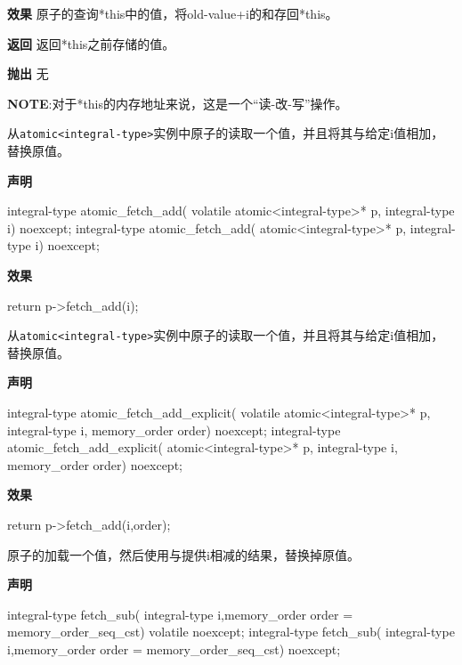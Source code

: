 \textbf{效果}
原子的查询*this中的值，将old-value+i的和存回*this。

\textbf{返回}
返回*this之前存储的值。

\textbf{抛出}
无

\textbf{NOTE}:对于*this的内存地址来说，这是一个“读-改-写”操作。


从\texttt{atomic<integral-type>}实例中原子的读取一个值，并且将其与给定i值相加，替换原值。

\textbf{声明}

\begin{cpp}
integral-type atomic_fetch_add(
    volatile atomic<integral-type>* p, integral-type i) noexcept;
integral-type atomic_fetch_add(
    atomic<integral-type>* p, integral-type i) noexcept;
\end{cpp}

\textbf{效果}

\begin{cpp}
return p->fetch_add(i);
\end{cpp}


从\texttt{atomic<integral-type>}实例中原子的读取一个值，并且将其与给定i值相加，替换原值。

\textbf{声明}

\begin{cpp}
integral-type atomic_fetch_add_explicit(
    volatile atomic<integral-type>* p, integral-type i,
    memory_order order) noexcept;
integral-type atomic_fetch_add_explicit(
    atomic<integral-type>* p, integral-type i, memory_order order)
    noexcept;
\end{cpp}

\textbf{效果}

\begin{cpp}
return p->fetch_add(i,order);
\end{cpp}


原子的加载一个值，然后使用与提供i相减的结果，替换掉原值。

\textbf{声明}

\begin{cpp}
integral-type fetch_sub(
    integral-type i,memory_order order = memory_order_seq_cst)
    volatile noexcept;
integral-type fetch_sub(
    integral-type i,memory_order order = memory_order_seq_cst) noexcept;
\end{cpp}

